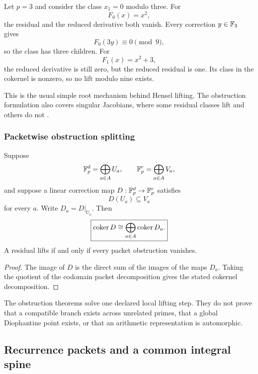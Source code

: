 \begin{histexample}\label{hist:ex:singular_polynomial_obstruction}
Let \(p=3\) and consider the class \(x_1=0\) modulo three. For
\[
F_0(x)=x^2,
\]
the residual and the reduced derivative both vanish. Every correction \(y\in\mathbb F_3\) gives
\[
F_0(3y)\equiv0\pmod9,
\]
so the class has three children. For
\[
F_1(x)=x^2+3,
\]
the reduced derivative is still zero, but the reduced residual is one. Its class in the cokernel is nonzero, so no lift modulo nine exists.
\end{histexample}

This is the usual simple root mechanism behind Hensel lifting. The obstruction formulation also covers singular Jacobians, where some residual classes lift and others do not \cite{Serre1979,Gouvea1997,Robert2000}.

\subsubsection{Packetwise obstruction splitting}

\begin{histtheorem}\label{hist:thm:packet_lift_obstruction}
Suppose
\[
\mathbb F_p^d
=
\bigoplus_{a\in A}U_a,
\qquad
\mathbb F_p^r
=
\bigoplus_{a\in A}V_a,
\]
and suppose a linear correction map \(D:\mathbb F_p^d\to\mathbb F_p^r\) satisfies
\[
D(U_a)\subseteq V_a
\]
for every \(a\). Write \(D_a=D|_{U_a}\). Then
\[
\boxed{
\operatorname{coker} D
\cong
\bigoplus_{a\in A}\operatorname{coker} D_a.
}
\]
A residual lifts if and only if every packet obstruction vanishes.
\end{histtheorem}

\begin{proof}
The image of \(D\) is the direct sum of the images of the maps \(D_a\). Taking the quotient of the codomain packet decomposition gives the stated cokernel decomposition.
\end{proof}

\begin{histremark}\label{hist:rem:lifting_boundary}
The obstruction theorems solve one declared local lifting step. They do not prove that a compatible branch exists across unrelated primes, that a global Diophantine point exists, or that an arithmetic representation is automorphic.
\end{histremark}

\subsection{Recurrence packets and a common integral spine}\label{hist:sec:recurrences}


